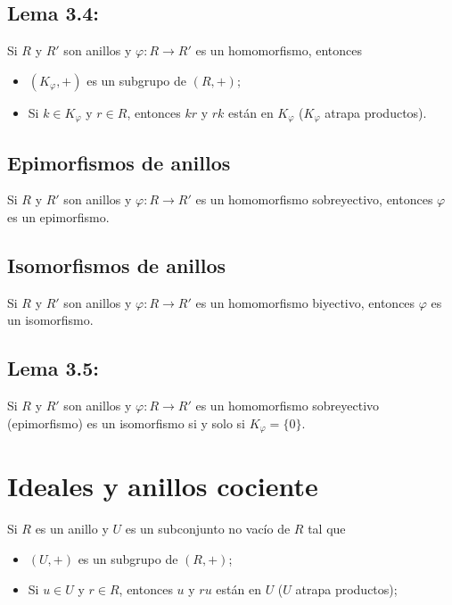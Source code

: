 \documentclass{article}
\begin{document}
\subsection*{\color{blue} Lema 3.4:}

Si $R$ y $R'$ son anillos y $\varphi:R\to R'$ es un homomorfismo, entonces

\begin{itemize}
\item $(K_{\varphi},+)$ es un subgrupo de $(R,+)$;
\item Si $k\in K_{\varphi}$ y $r\in R$, entonces $kr$ y $rk$ están en $K_{\varphi}$ ($K_{\varphi}$ atrapa productos).
\end{itemize}

\subsection*{\color{violet} Epimorfismos de anillos}

Si $R$ y $R'$ son anillos y $\varphi:R\to R'$ es un homomorfismo sobreyectivo, entonces $\varphi$ es un epimorfismo.

\subsection*{\color{violet} Isomorfismos de anillos}

Si $R$ y $R'$ son anillos y $\varphi:R\to R'$ es un homomorfismo biyectivo, entonces $\varphi$ es un isomorfismo.

\subsection*{\color{blue} Lema 3.5:}

Si $R$ y $R'$ son anillos y $\varphi:R\to R'$ es un homomorfismo sobreyectivo (epimorfismo) es un isomorfismo si y solo si $K_{\varphi}=\{0\}$.

\newpage
\section{Ideales y anillos cociente}

Si $R$ es un anillo y $U$ es un subconjunto no vacío de $R$ tal que

\begin{itemize}

\item $(U,+)$ es un subgrupo de $(R,+)$;

\item Si $u\in U$ y $r\in R$, entonces $u$ y $ru$ están en $U$ ($U$ atrapa productos);

\end{itemize}
\end{document}
